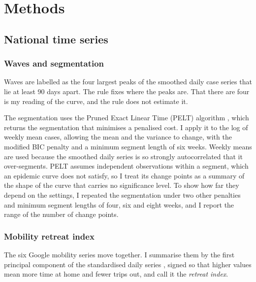 \chapter{Methods}\label{ch:methods}

\section{National time series}
\subsection{Waves and segmentation}\label{sec:waves}
Waves are labelled as the four largest peaks of the smoothed daily case series that lie at least 90 days apart. The rule fixes where the peaks are. That there are four is my reading of the curve, and the rule does not estimate it.

The segmentation uses the Pruned Exact Linear Time (PELT) algorithm \parencite{killick2012}, which returns the segmentation that minimises a penalised cost. I apply it to the log of weekly mean cases, allowing the mean and the variance to change, with the modified BIC penalty and a minimum segment length of six weeks. Weekly means are used because the smoothed daily series is so strongly autocorrelated that it over-segments. PELT assumes independent observations within a segment, which an epidemic curve does not satisfy, so I treat its change points as a summary of the shape of the curve that carries no significance level. To show how far they depend on the settings, I repeated the segmentation under two other penalties and minimum segment lengths of four, six and eight weeks, and I report the range of the number of change points.

\subsection{Mobility retreat index}
The six Google mobility series move together. I summarise them by the first principal component of the standardised daily series \parencite{hastie2009}, signed so that higher values mean more time at home and fewer trips out, and call it the \emph{retreat index}.

